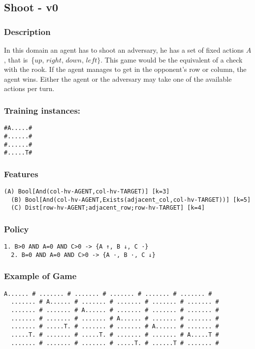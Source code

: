 \documentclass[a4paper]{article}
\begin{document}
\subsection{Shoot - v0}
\subsubsection{Description}
In this domain an agent has to shoot an adversary, he has a set of fixed actions $A$, that is~\{$up$, $right$, $down$, $left\}$. This game would be the equivalent of a check with the rook. If the agent manages to get in the opponent's row or column, the agent wins. Either the agent or the adversary may take one of the available actions per turn.

\subsubsection{Training instances:}
\begin{Verbatim}[fontsize=\footnotesize]
#A.....#
#......#
#......#
#.....T#
\end{Verbatim}

\subsubsection{Features}
\begin{Verbatim}[fontsize=\footnotesize]
  (A) Bool[And(col-hv-AGENT,col-hv-TARGET)] [k=3]
  (B) Bool[And(col-hv-AGENT,Exists(adjacent_col,col-hv-TARGET))] [k=5]
  (C) Dist[row-hv-AGENT;adjacent_row;row-hv-TARGET] [k=4]

\end{Verbatim}

\subsubsection{Policy}
\begin{Verbatim}[fontsize=\footnotesize]
  1. B>0 AND A=0 AND C>0 -> {A ↑, B ↓, C ·}
  2. B=0 AND A=0 AND C>0 -> {A ·, B ·, C ↓}
\end{Verbatim}

\subsubsection{Example of Game}
\begin{Verbatim}[fontsize=\footnotesize]
  A...... # ....... # ....... # ....... # ....... # ....... #
  ....... # A...... # ....... # ....... # ....... # ....... #
  ....... # ....... # A...... # ....... # ....... # ....... #
  ....... # ....... # ....... # A...... # ....... # ....... #
  ....... # .....T. # ....... # ....... # A...... # ....... #
  .....T. # ....... # .....T. # ....... # ....... # A.....T #
  ....... # ....... # ....... # .....T. # ......T # ....... #
\end{Verbatim}
\end{document}
